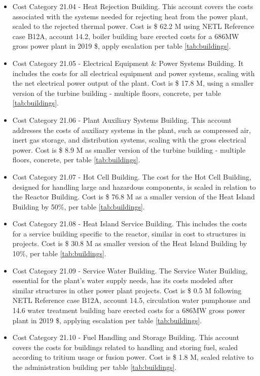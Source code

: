 \begin{itemize}
\item Cost Category 21.04 - Heat Rejection Building. This account covers the costs associated with the systems needed for rejecting heat from the power plant, scaled to the rejected thermal power. Cost is \$ 62.2 M using NETL Reference case B12A, account 14.2, boiler building bare erected costs for a 686MW gross power plant in 2019 \$, apply escalation per table \ref{tab:buildings}. 
\item Cost Category 21.05 - Electrical Equipment \& Power Systems Building. It includes the costs for all electrical equipment and power systems, scaling with the net electrical power output of the plant. Cost is \$ 17.8 M, using a smaller version of the turbine building - multiple floors, concrete, per table \ref{tab:buildings}.
\item Cost Category 21.06 - Plant Auxiliary Systems Building. This account addresses the costs of auxiliary systems in the plant, such as compressed air, inert gas storage, and distribution systems, scaling with the gross electrical power. Cost is \$ 8.9 M as smaller version of the turbine building - multiple floors, concrete, per table \ref{tab:buildings}. 
\item Cost Category 21.07 - Hot Cell Building. The cost for the Hot Cell Building, designed for handling large and hazardous components, is scaled in relation to the Reactor Building.  Cost is \$ 76.8 M as a smaller version of the Heat Island Building by 50\%, per table \ref{tab:buildings}.  
\item Cost Category 21.08 - Heat Island Service Building. This includes the costs for a service building specific to the reactor, similar in cost to structures in projects. Cost is \$ 30.8 M as smaller version of the Heat Island Building by 10\%, per table \ref{tab:buildings}.  
\item Cost Category 21.09 - Service Water Building. The Service Water Building, essential for the plant’s water supply needs, has its costs modeled after similar structures in other power plant projects. Cost is \$ 0.5 M following NETL Reference case B12A, account 14.5, circulation water pumphouse and 14.6 water treatment building bare erected costs for a 686MW gross power plant in 2019 \$, applying escalation per table \ref{tab:buildings}.
\item Cost Category 21.10 - Fuel Handling and Storage Building. This account covers the costs for buildings related to handling and storing fuel, scaled according to tritium usage or fusion power. Cost is \$ 1.8 M, scaled relative to the administration building per table \ref{tab:buildings}. 

\end{itemize}
